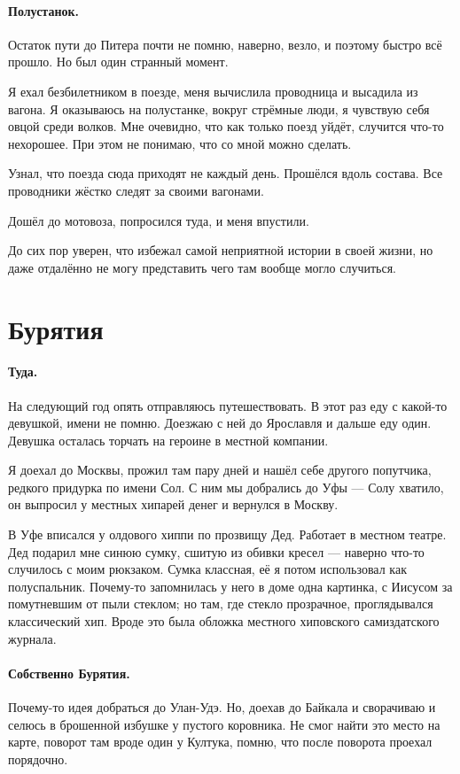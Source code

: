 \documentclass{book}
\begin{document}
\paragraph{Полустанок.}
Остаток пути до Питера почти не помню, наверно, везло, и поэтому быстро всё прошло.
Но был один странный момент.

Я ехал безбилетником в поезде, меня вычислила проводница и высадила из вагона.
Я оказываюсь на полустанке, вокруг стрёмные люди, я чувствую себя овцой среди волков.
Мне очевидно, что как только поезд уйдёт, случится что-то нехорошее.
При этом не понимаю, что со мной можно сделать.

Узнал, что поезда сюда приходят не каждый день.
Прошёлся вдоль состава.
Все проводники жёстко следят за своими вагонами.

Дошёл до мотовоза, попросился туда, и меня впустили.

До сих пор уверен, что избежал самой неприятной истории в своей жизни, но даже отдалённо не могу представить чего там вообще могло случиться.

\section*{Бурятия}

\paragraph{Туда.}
На следующий год опять отправляюсь путешествовать.
В этот раз еду с какой-то девушкой, имени не помню.
Доезжаю с ней до Ярославля и дальше еду один.
Девушка осталась торчать на героине в местной компании.

Я доехал до Москвы, прожил там пару дней и нашёл себе другого попутчика, редкого придурка по имени Сол.
С ним мы добрались до Уфы --- Солу хватило, он выпросил у местных хипарей денег и вернулся в Москву.

В Уфе вписался у олдового хиппи по прозвищу Дед.
Работает в местном театре.
Дед подарил мне синюю сумку, сшитую из обивки кресел --- наверно что-то случилось с моим рюкзаком.
Сумка классная, её я потом использовал как полуспальник.
Почему-то запомнилась у него в доме одна картинка, с Иисусом за помутневшим от пыли стеклом;
но там, где стекло прозрачное, проглядывался классический хип.
Вроде это была обложка местного хиповского самиздатского журнала.

\paragraph{Собственно Бурятия.}
Почему-то идея добраться до Улан-Удэ.
Но, доехав до Байкала и сворачиваю и селюсь в брошенной избушке у пустого коровника.
Не смог найти это место на карте, поворот там вроде один у Култука, помню, что после поворота проехал порядочно.
\end{document}
